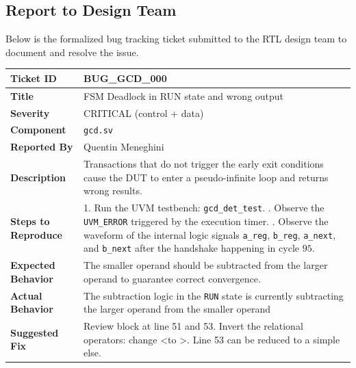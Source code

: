 \subsection*{Report to Design Team}

Below is the formalized bug tracking ticket submitted to the RTL design team to document and resolve the issue.

\begin{table}[H]
    \centering
    \renewcommand{\arraystretch}{1.3} 
    \begin{tabularx}{\textwidth}{|>{\bfseries}l|X|}
        \hline
        Ticket ID           & BUG\_GCD\_000 \\ \hline
        Title               & FSM Deadlock in RUN state and wrong output \\ \hline
        Severity            & CRITICAL (control + data) \\ \hline
        Component           & \texttt{gcd.sv} \\ \hline
        Reported By         & Quentin Meneghini \\ \hline
        Description         & Transactions that do not trigger the early exit conditions cause the DUT to enter a pseudo-infinite loop and returns wrong results. \\ \hline
        Steps to Reproduce  & 
        1. Run the UVM testbench: \texttt{gcd\_det\_test}. \newline
        2. Observe the \texttt{UVM\_ERROR} triggered by the execution timer. \newline
        3. Observe the waveform of the internal logic signals \texttt{a\_reg}, \texttt{b\_reg}, \texttt{a\_next}, and \texttt{b\_next} after the handshake happening in cycle $95$. \\ \hline
        Expected Behavior   & The smaller operand should be subtracted from the larger operand to guarantee correct convergence. \\ \hline
        Actual Behavior     & The subtraction logic in the \texttt{RUN} state is currently subtracting the larger operand from the smaller operand \\ \hline
        Suggested Fix       & Review block at line 51 and 53. Invert the relational operators: change \textless to \textgreater. Line 53 can be reduced to a simple else. \\ \hline
    \end{tabularx}
\end{table}
